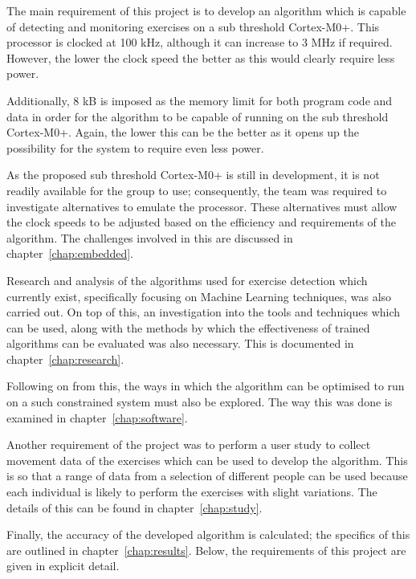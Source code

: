 
The main requirement of this project is to develop an algorithm which is capable of detecting and monitoring exercises on a sub threshold Cortex-M0+. This processor is clocked at 100 kHz, although it can increase to 3 MHz if required. However, the lower the clock speed the better as this would clearly require less power.

Additionally, 8 kB is imposed as the memory limit for both program code and data in order for the algorithm to be capable of running on the sub threshold Cortex-M0+. Again, the lower this can be the better as it opens up the possibility for the system to require even less power.

As the proposed sub threshold Cortex-M0+ is still in development, it is not readily available for the group to use; consequently, the team was required to investigate alternatives to emulate the processor. These alternatives must allow the clock speeds to be adjusted based on the efficiency and requirements of the algorithm. The challenges involved in this are discussed in chapter~\ref{chap:embedded}.

Research and analysis of the algorithms used for exercise detection which currently exist, specifically focusing on Machine Learning techniques, was also carried out. On top of this, an investigation into the tools and techniques which can be used, along with the methods by which the effectiveness of trained algorithms can be evaluated was also necessary. This is documented in chapter~\ref{chap:research}.

Following on from this, the ways in which the algorithm can be optimised to run on a such constrained system must also be explored. The way this was done is examined in chapter~\ref{chap:software}.

Another requirement of the project was to perform a user study to collect movement data of the exercises which can be used to develop the algorithm. This is so that a range of data from a selection of different people can be used because each individual is likely to perform the exercises with slight variations. The details of this can be found in chapter~\ref{chap:study}.

Finally, the accuracy of the developed algorithm is calculated; the specifics of this are outlined in chapter~\ref{chap:results}.
Below, the requirements of this project are given in explicit detail.


